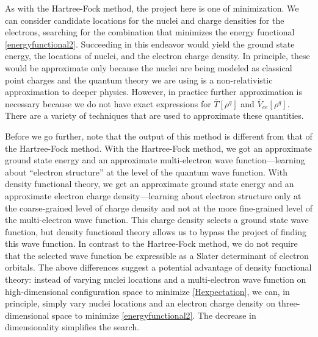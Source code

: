 \documentclass[12pt,onecolumn,secnumarabic,amsmath,amssymb,balancelastpage,nofootinbib]{article}
\begin{document}
As with the Hartree-Fock method, the project here is one of minimization.  We can consider candidate locations for the nuclei and charge densities for the electrons, searching for the combination that minimizes the energy functional \eqref{energyfunctional2}.  Succeeding in this endeavor would yield the ground state energy, the locations of nuclei, and the electron charge density.  In principle, these would be approximate only because the nuclei are being modeled as classical point charges and the quantum theory we are using is a non-relativistic approximation to deeper physics.  However, in practice further approximation is necessary because we do not have exact expressions for $\overline{T}[\rho^q]$ and $\overline{V}_{ee}[\rho^q]$.  There are a variety of techniques that are used to approximate these quantities.

Before we go further, note that the output of this method is different from that of the Hartree-Fock method.  With the Hartree-Fock method, we got an approximate ground state energy and an approximate multi-electron wave function---learning about ``electron structure'' at the level of the quantum wave function.  With density functional theory, we get an approximate ground state energy and an approximate electron charge density---learning about electron structure only at the coarse-grained level of charge density and not at the more fine-grained level of the multi-electron wave function.  This charge density selects a ground state wave function, but density functional theory allows us to bypass the project of finding this wave function.  In contrast to the Hartree-Fock method, we do not require that the selected wave function be expressible as a Slater determinant of electron orbitals.  The above differences suggest a potential advantage of density functional theory: instead of varying nuclei locations and a multi-electron wave function on high-dimensional configuration space to minimize \eqref{Hexpectation}, we can, in principle, simply vary nuclei locations and an electron charge density on three-dimensional space to minimize \eqref{energyfunctional2}.  The decrease in dimensionality simplifies the search.
\end{document}
